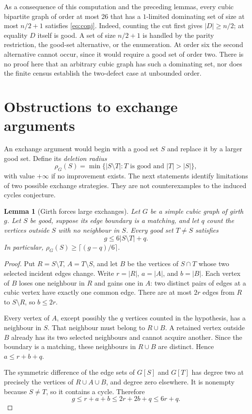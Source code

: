 \documentclass[11pt]{article}
\newtheorem{lemma}[theorem]{Lemma}
\begin{document}
As a consequence of this computation and the preceding lemmas,
every cubic bipartite graph of order at most 26 that has a
$1$-limited dominating set of size at most $n/2+1$ satisfies
\eqref{eq:conj}. Indeed, counting the cut first gives $|D|\geq n/2$;
at equality $D$ itself is good. A set of size $n/2+1$ is handled
by the parity restriction, the good-set alternative, or the
enumeration. At order six the second alternative cannot occur,
since it would require a good set of order two.
There is no proof here that an arbitrary cubic graph has such a
dominating set, nor does the finite census establish the two-defect
case at unbounded order.

\section{Obstructions to exchange arguments}
An exchange argument would begin with a good set $S$ and replace
it by a larger good set. Define its \emph{deletion radius}
\[
 \rho_G(S)=\min\{|S\setminus T|:T\text{ is good and }|T|>|S|\},
\]
with value $+\infty$ if no improvement exists. The next statements
identify limitations of two possible exchange strategies. They
are not counterexamples to the induced cycles conjecture.

\begin{lemma}[Girth forces large exchanges]\label{lem:exchange-girth}
Let $G$ be a simple cubic graph of girth $g$. Let $S$ be good,
suppose its edge boundary is a matching, and let $q$ count the
vertices outside $S$ with no neighbour in $S$. Every good set
$T\ne S$ satisfies
\[
 g\leq6|S\setminus T|+q.
\]
In particular, $\rho_G(S)\geq\lceil(g-q)/6\rceil$.
\end{lemma}
\begin{proof}
Put $R=S\setminus T$, $A=T\setminus S$, and let $B$ be the
vertices of $S\cap T$ whose two selected incident edges change.
Write $r=|R|$, $a=|A|$, and $b=|B|$. Each vertex of $B$ loses
one neighbour in $R$ and gains one in $A$: two distinct pairs
of edges at a cubic vertex have exactly one common edge.
There are at most $2r$ edges from $R$ to $S\setminus R$, so
$b\leq2r$.

Every vertex of $A$, except possibly the $q$ vertices counted
in the hypothesis, has a neighbour in $S$. That neighbour must
belong to $R\cup B$. A retained vertex outside $B$ already has
its two selected neighbours and cannot acquire another.
Since the boundary is a matching, these neighbours in $R\cup B$
are distinct. Hence $a\leq r+b+q$.

The symmetric difference of the edge sets of $G[S]$ and $G[T]$
has degree two at precisely the vertices of $R\cup A\cup B$,
and degree zero elsewhere. It is nonempty because $S\ne T$,
so it contains a cycle. Therefore
\[
 g\leq r+a+b\leq2r+2b+q\leq6r+q.
\]
\end{proof}
\end{document}
